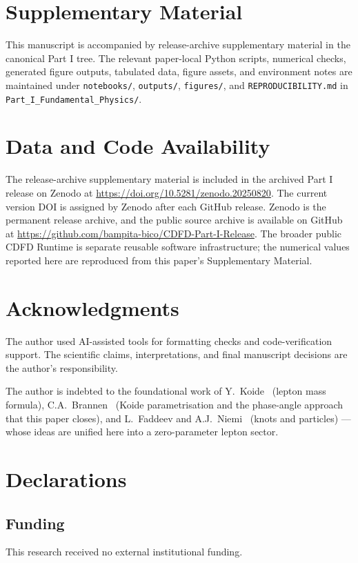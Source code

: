 \documentclass[11pt]{article}
\begin{document}
\section*{Supplementary Material}

This manuscript is accompanied by release-archive supplementary material in
the canonical Part I tree. The relevant paper-local Python scripts, numerical checks, generated figure outputs,
tabulated data, figure assets, and environment notes are maintained under
\texttt{notebooks/}, \texttt{outputs/}, \texttt{figures/}, and
\texttt{REPRODUCIBILITY.md} in \texttt{Part\_I\_Fundamental\_Physics/}.


\section*{Data and Code Availability}

The release-archive supplementary material is included in the archived Part I
release on Zenodo at \url{https://doi.org/10.5281/zenodo.20250820}. The current version DOI is assigned by Zenodo after each GitHub release. Zenodo is the
permanent release archive, and the public source archive is available on GitHub at
\url{https://github.com/bampita-bico/CDFD-Part-I-Release}. The broader public CDFD
Runtime is separate reusable software infrastructure; the numerical values reported
here are reproduced from this paper's Supplementary Material.


\section*{Acknowledgments}
The author used AI-assisted tools for formatting checks and code-verification
support. The scientific claims, interpretations, and final manuscript decisions
are the author's responsibility.

The author is indebted to the foundational work of
Y.~Koide~\cite{Koide1983,Koide2005} (lepton mass formula),
C.A.~Brannen~\cite{Brannen2006} (Koide parametrisation and the
phase-angle approach that this paper closes),
and L.~Faddeev and A.J.~Niemi~\cite{FaddeevNiemi1997} (knots and particles)
--- whose ideas are unified here into a zero-parameter lepton sector.

\section*{Declarations}

\subsection*{Funding}
This research received no external institutional funding.
\end{document}

